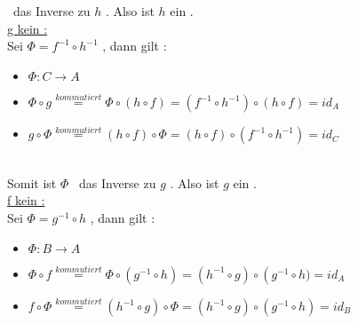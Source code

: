 		\ das Inverse zu 
		\begin{math}
			h
		\end{math}
		. 
		Also ist 
		\begin{math}
			h
		\end{math}
		ein \Iso. 
		\\
		\underline {g kein \Iso :}
		\\
		Sei 
		\begin{math}
			\Phi=f^{-1} \circ h^{-1}
		\end{math}		
		, dann gilt :
		\begin{itemize}
			\item 
				\begin{math}
					\Phi : C \to A
				\end{math}
			\item
				\begin{math}
					\Phi \circ g \overset{ kommutiert}{=}
					\Phi \circ \left( 
						h \circ f  
						\right) =
					\left( f^{-1} \circ h^{-1} \right) 
					\circ 
					\left( h \circ f  \right)= 
					id_{A}
				\end{math}
			\item
				\begin{math}
					g \circ \Phi \overset{ kommutiert}{=}
					\left( 
						h \circ f
 						\right) \circ \Phi =
					\left( h \circ f  \right)
					\circ
					\left( f^{-1} \circ h^{-1} \right)=
					id_{C}
				\end{math}
		\end{itemize}
		\\
		Somit ist 
		\begin{math}
			\Phi
		\end{math}
		\ das Inverse zu 
		\begin{math}
			g
		\end{math}
		. 
		Also ist 
		\begin{math}

			g
		\end{math}
		ein \Iso. 
		\\
		\underline {f kein \Iso :}
		\\
		Sei 
		\begin{math}
			\Phi=g^{-1} \circ h
		\end{math}		
		, dann gilt :
		\begin{itemize}
			\item 
				\begin{math}
					\Phi : B \to A
				\end{math}
			\item
				\begin{math}
					\Phi \circ f \overset{ kommutiert}{=}
					\Phi \circ \left( 
						g^{-1} \circ h  
						\right) =
					\left(  h^{-1} \circ g \right) 
					\circ 
					\left( g^{-1} \circ h )= 
					id_{A}
				\end{math}
			\item
				\begin{math}
					f \circ \Phi \overset{ kommutiert}{=}
					\left( 
						h^{-1} \circ g
 						\right) \circ \Phi =
					\left(h^{-1} \circ g \right)
					\circ
					\left( g^{-1} \circ h  \right)=
					id_{B}
				\end{math}
		\end{itemize}
